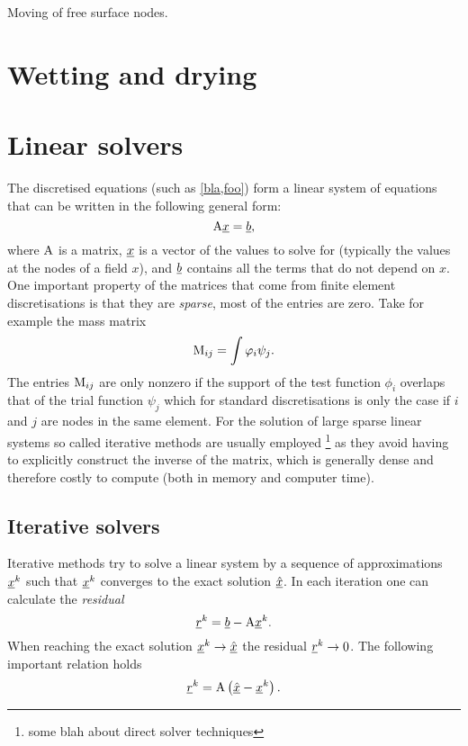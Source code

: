 Moving of free surface nodes.

\section{Wetting and drying}\label{Wetting_Drying}

\section{Linear solvers} \label{ND_Linear_solvers}
The discretised equations (such as \eqref{bla,foo}) form 
a linear system of equations that can be written 
in the following general form:
\begin{equation*}
  \mathrm{A}\underline{x}=\underline{b},
\end{equation*}
where $\mathrm{A}$ is a matrix, $\underline{x}$ is a vector of the values 
to solve for (typically the values at the nodes of a field $x$), 
and $\underline{b}$ contains all the terms that do not depend on 
$x$. One important property of the matrices that come from 
finite element discretisations is that they are \emph{sparse}, 
\ie most of the entries are zero. Take for example the mass matrix
\begin{equation*}
  \mathrm{M}_{ij}=\int \varphi_i \psi_j.
\end{equation*}
The entries $\mathrm{M}_{ij}$ are only nonzero if the support of the 
test function $\phi_i$ overlaps that of the trial function 
$\psi_j$ which for standard \PN discretisations is only the case if
$i$ and $j$ are nodes in the same element. For the solution of large
sparse linear systems so called iterative methods are usually employed
\footnote{some blah about direct solver techniques} as they 
avoid having to explicitly construct the inverse of the matrix, 
which is generally dense and therefore costly to compute 
(both in memory and computer time).

\subsection{Iterative solvers}
Iterative methods try to solve a linear system by a sequence 
of approximations $\underline{x}^k$ such that $\underline{x}^k$ converges to
the exact solution $\underline{\hat x}$. In each iteration one can 
calculate the \emph{residual}
\begin{equation*}
  \underline{r}^k = \underline{b} - \mathrm{A}\underline{x}^k.
\end{equation*}
When reaching the exact solution $\underline{x}^k\to\underline{\hat x}$ the 
residual $\underline{r}^k\to 0$. The following important relation holds
\begin{equation}\label{eq:residual_error}
  \underline{r}^k = \mathrm{A}\left( \underline{\hat x} - \underline{x}^k \right).
\end{equation}

